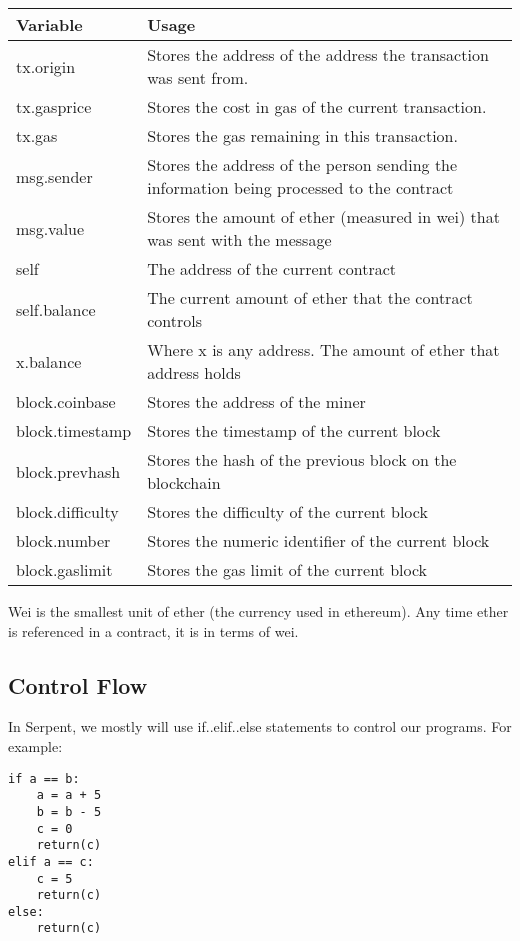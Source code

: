\documentclass[12pt]{article}
\begin{document}
\begin{center}
	\begin{tabular}{| l | p{9cm} |}
	\hline
	Variable & Usage \\ \hline
	tx.origin & Stores the address of the address the transaction was sent from. \\ \hline
	tx.gasprice & Stores the cost in gas of the current transaction. \\ \hline	
	tx.gas & Stores the gas remaining in this transaction. \\ \hline
	msg.sender & Stores the address of the person sending the information being processed to the contract \\ \hline
	msg.value & Stores the amount of ether (measured in wei) that was sent with the message \\ \hline
	self & The address of the current contract \\ \hline
	self.balance & The current amount of ether that the contract controls \\ \hline
	x.balance & Where x is any address. The amount of ether that address holds \\ \hline
	block.coinbase & Stores the address of the miner \\ \hline
	block.timestamp & Stores the timestamp of the current block \\ \hline
	block.prevhash & Stores the hash of the previous block on the blockchain \\ \hline
	block.difficulty & Stores the difficulty of the current block \\ \hline
	block.number & Stores the numeric identifier of the current block \\ \hline
	block.gaslimit & Stores the gas limit of the current block \\ \hline
	\end{tabular}
\end{center}

Wei is the smallest unit of ether (the currency used in ethereum). Any time ether is referenced in a contract, it is in terms of wei.

\subsection{Control Flow}

	In Serpent, we mostly will use if..elif..else statements to control our programs. For example:
	
\begin{lstlisting}
if a == b:
	a = a + 5
	b = b - 5
	c = 0
	return(c)
elif a == c: 
	c = 5
	return(c)
else:
	return(c)
\end{lstlisting}
\end{document}
